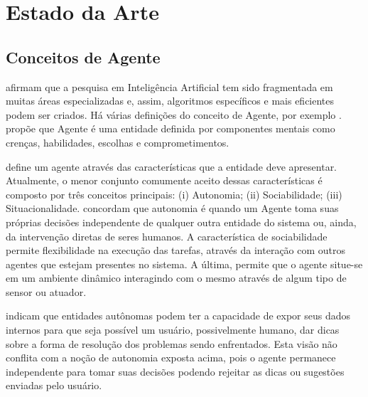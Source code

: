 \chapter{Estado da Arte}


\section{Conceitos de Agente}

\citet{laird2001human} afirmam que a pesquisa em Inteligência Artificial tem
sido fragmentada em muitas áreas especializadas e, assim, algoritmos
específicos e mais eficientes podem ser criados.
%
Há várias definições do conceito de Agente, por exemplo
\cite{shoham1993agent,roadmap,fatemeh2009multi}. \citet{shoham1993agent}
propõe que Agente é uma entidade definida por componentes mentais como
crenças, habilidades, escolhas e comprometimentos.

\citet{franklin1997agent} define um agente através das características que a
entidade deve apresentar.  Atualmente, o menor conjunto comumente aceito
dessas características é composto por três conceitos principais: (i)
Autonomia; (ii) Sociabilidade; (iii) Situacionalidade.
\citet{roadmap,fatemeh2009multi} concordam que autonomia é quando um Agente
toma suas próprias decisões independente de qualquer outra entidade do sistema
ou, ainda, da intervenção diretas de seres humanos. A característica de
sociabilidade permite flexibilidade na execução das tarefas, através da
interação com outros agentes que estejam presentes no sistema. A última,
permite que o agente situe-se em um ambiente dinâmico interagindo com o mesmo
através de algum tipo de sensor ou atuador.

\citet{ingrand1992architecture} indicam que entidades autônomas podem ter a
capacidade de expor seus dados internos para que seja possível um usuário,
possivelmente humano, dar dicas sobre a forma de resolução dos problemas sendo
enfrentados. Esta visão não conflita com a noção de autonomia exposta acima,
pois o agente permanece independente para tomar suas decisões podendo rejeitar
as dicas ou sugestões enviadas pelo usuário.

